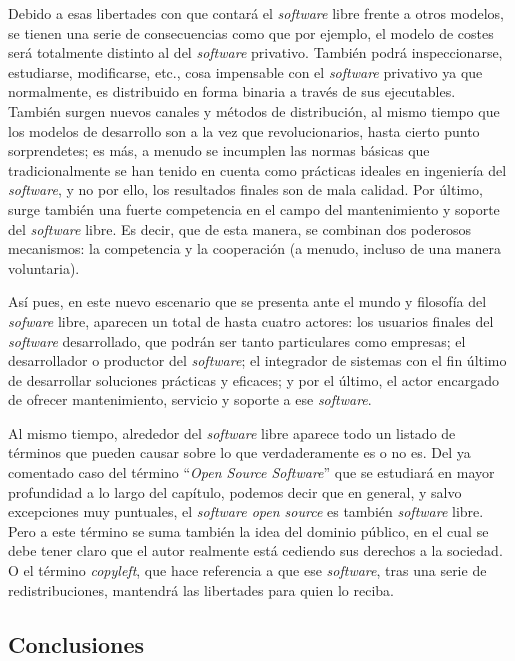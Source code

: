 Debido a esas libertades con que contará el \textit{software} libre frente a
otros modelos, se tienen una serie de consecuencias como que por ejemplo, el
modelo de costes será totalmente distinto al del \textit{software} privativo.
También podrá inspeccionarse, estudiarse, modificarse, etc., cosa impensable
con el \textit{software} privativo ya que normalmente, es distribuido en forma
binaria a través de sus ejecutables. También surgen nuevos canales y métodos de
distribución, al mismo tiempo que los modelos de desarrollo son a la vez que
revolucionarios, hasta cierto punto sorprendetes; es más, a menudo se incumplen
las normas básicas que tradicionalmente se han tenido en cuenta como prácticas
ideales en ingeniería del \textit{software}, y no por ello, los resultados
finales son de mala calidad. Por último, surge también una fuerte competencia
en el campo del mantenimiento y soporte del \textit{software} libre. Es decir,
que de esta manera, se combinan dos poderosos mecanismos: la competencia y la
cooperación (a menudo, incluso de una manera voluntaria).

Así pues, en este nuevo escenario que se presenta ante el mundo y filosofía del
\textit{sofware} libre, aparecen un total de hasta cuatro actores: los usuarios
finales del \textit{software} desarrollado, que podrán ser tanto particulares
como empresas; el desarrollador o productor del \textit{software}; el integrador
de sistemas con el fin último de desarrollar soluciones prácticas y eficaces; y
por el último, el actor encargado de ofrecer mantenimiento, servicio y soporte a
ese \textit{software}.

Al mismo tiempo, alrededor del \textit{software} libre aparece todo un listado
de términos que pueden causar sobre lo que verdaderamente es o no es. Del ya
comentado caso del término ``\textit{Open Source Software}'' que se estudiará en
mayor profundidad a lo largo del capítulo, podemos decir que en general, y salvo
excepciones muy puntuales, el \textit{software open source} es también
\textit{software} libre. Pero a este término se suma también la idea del
dominio público, en el cual se debe tener claro que el autor realmente está
cediendo sus derechos a la sociedad. O el término \textit{copyleft}, que hace
referencia a que ese \textit{software}, tras una serie de redistribuciones,
mantendrá las libertades para quien lo reciba.

\subsection{Conclusiones}

